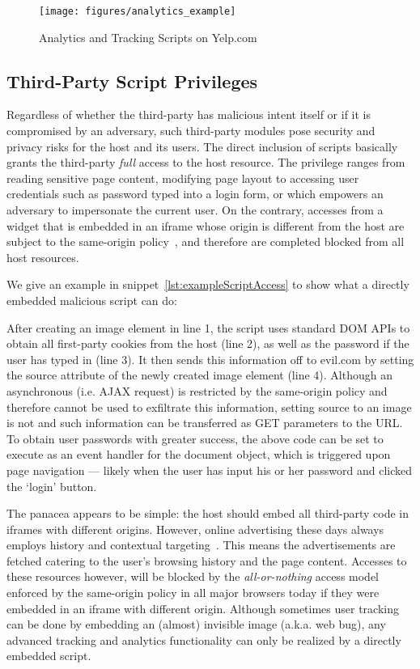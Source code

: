 \begin{figure}[bth]
\centering
\texttt{[image: figures/analytics\_example]}
\caption{Analytics and Tracking Scripts on Yelp.com}
\label{fig:analytics_example}
\end{figure}

\subsection{Third-Party Script Privileges}
Regardless of whether the third-party has malicious intent itself or if it is compromised by an adversary, such third-party modules pose security and privacy risks for the host and its users.  The direct inclusion of scripts basically grants the third-party \emph{full} access to the host resource.  The privilege ranges from reading sensitive page content, modifying page layout to accessing user credentials such as password typed into a login form, or  which empowers an adversary to impersonate the current user.  On the contrary, accesses from a widget that is embedded in an iframe whose origin is different from the host are subject to the same-origin policy~\cite{SOP}, and therefore are completed blocked from all host resources.

We give an example in snippet~\ref{lst:exampleScriptAccess} to show what a directly embedded malicious script can do:  



After creating an image element in line 1, the script uses standard DOM APIs to obtain all first-party cookies from the host (line 2), as well as the password if the user has typed in (line 3).  It then sends this information off to evil.com by setting the source attribute of the newly created image element (line 4).  Although an asynchronous  (i.e. AJAX request) is restricted by the same-origin policy and therefore cannot be used to exfiltrate this information, setting source to an image is not and such information can be transferred as GET parameters to the URL.  To obtain user passwords with greater success, the above code can be set to execute as an  event handler for the document object, which is triggered upon page navigation --- likely when the user has input his or her password and clicked the `login' button.

The panacea appears to be simple: the host should embed all third-party code in iframes with different origins.  However, online advertising these days always employs history and contextual targeting~\cite{Gill:2013:BPF:2504730.2504768}.  This means the advertisements are fetched catering to the user's browsing history and the page content.  Accesses to these resources however, will be blocked by the \emph{all-or-nothing} access model enforced by the same-origin policy in all major browsers today if they were embedded in an iframe with different origin.  Although sometimes user tracking can be done by embedding an (almost) invisible image (a.k.a. web bug), any advanced tracking and analytics functionality can only be realized by a directly embedded script.  

